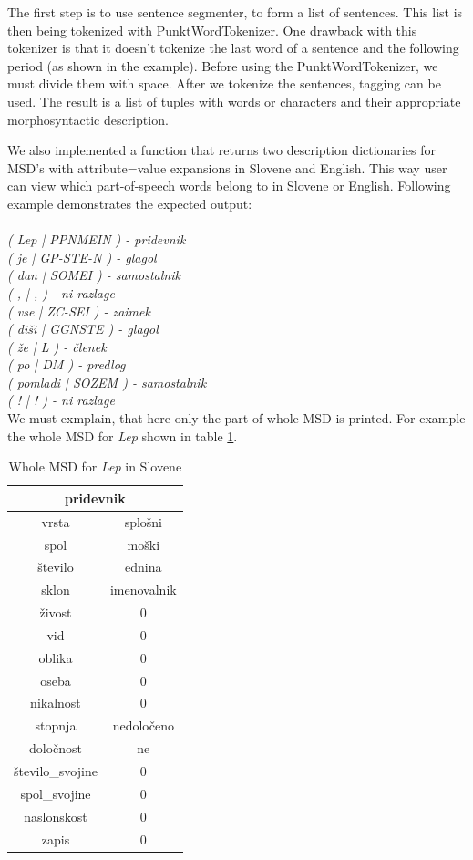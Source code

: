 \documentclass[10pt, conference, compsocconf]{IEEEtran}
\begin{document}
The first step is to use sentence segmenter, to form a list of sentences. This list is then being tokenized with PunktWordTokenizer. One drawback with this tokenizer is that it doesn't tokenize the last word of a sentence and the following period (as shown in the example). Before using the PunktWordTokenizer, we must divide them with space. After we tokenize the sentences, tagging can be used. The result is a list of tuples with words or characters and their appropriate morphosyntactic description. 

We also implemented a function that returns two description dictionaries for MSD's with attribute=value expansions in Slovene and English. This way user can view which part-of-speech words belong to in Slovene or English. Following example demonstrates the expected output:
\\\\
\textit{( Lep  |  PPNMEIN ) - pridevnik \\
	( je  |  GP-STE-N ) - glagol\\
	( dan  |  SOMEI ) - samostalnik\\
	( ,  |  , ) - ni razlage\\
	( vse  |  ZC-SEI ) - zaimek\\
	( diši  |  GGNSTE ) - glagol\\
	( že  |  L ) - členek\\
	( po  |  DM ) - predlog\\
	( pomladi  |  SOZEM ) - samostalnik\\
	( !  |  ! ) - ni razlage}\\

We must exmplain, that here only the part of whole MSD is printed. For example the whole MSD for \textit{Lep} shown in table \ref{tab:MSDLep}.

\begin{table}[h]
\begin{center}
\begin{tabular}{c|c}
\multicolumn{2}{c}{pridevnik}\\\hline\hline
vrsta & splošni \\
spol & moški \\
število & ednina \\
sklon & imenovalnik \\
živost & 0 \\
vid & 0 \\
oblika & 0 \\
oseba & 0 \\
nikalnost & 0 \\
stopnja & nedoločeno \\
določnost & ne \\
število\_svojine & 0 \\
spol\_svojine & 0 \\
naslonskost & 0 \\
zapis & 0 \\
\end{tabular}
\end{center}
\caption{Whole MSD for \textit{Lep} in Slovene}
\label{tab:MSDLep}
\end{table}
\end{document}
